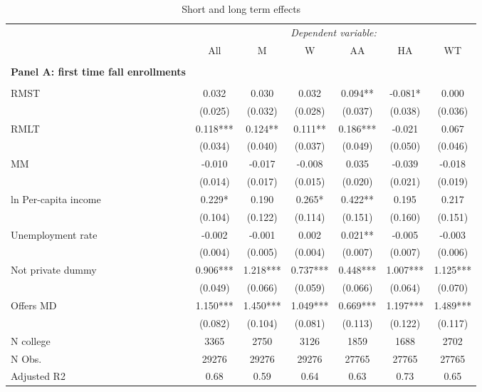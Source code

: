 \documentclass[12pt]{article}%
\begin{document}
\FloatBarrier
\begin{table}[!htbp] \centering 
  \begin{threeparttable}
      \caption{Short and long term effects }
   \label{table:sl}
  \small
\begin{tabular}{@{\extracolsep{-6pt}}lcccccc} 
\toprule
 & \multicolumn{6}{c}{\textit{ Dependent variable:}} \\ 
\cline{2-7} 
& All & M & W & AA & HA & WT \\
\midrule  \\[-1.8ex] 
\textbf{Panel A: first time fall enrollments}\\ \\[-1.8ex] 
RMST & 0.032 & 0.030 & 0.032 & 0.094** & -0.081* & 0.000 \\
& (0.025) & (0.032) & (0.028) & (0.037) & (0.038) & (0.036) \\
RMLT & 0.118*** & 0.124** & 0.111** & 0.186*** & -0.021 & 0.067 \\
& (0.034) & (0.040) & (0.037) & (0.049) & (0.050) & (0.046) \\
MM & -0.010 & -0.017 & -0.008 & 0.035 & -0.039 & -0.018 \\
& (0.014) & (0.017) & (0.015) & (0.020) & (0.021) & (0.019) \\
ln Per-capita income & 0.229* & 0.190 & 0.265* & 0.422** & 0.195 &
0.217 \\
& (0.104) & (0.122) & (0.114) & (0.151) & (0.160) & (0.151) \\
Unemployment rate & -0.002 & -0.001 & 0.002 & 0.021** & -0.005 &
-0.003 \\
& (0.004) & (0.005) & (0.004) & (0.007) & (0.007) & (0.006) \\
Not private dummy & 0.906*** & 1.218*** & 0.737*** & 0.448*** & 1.007***
& 1.125*** \\
& (0.049) & (0.066) & (0.059) & (0.066) & (0.064) & (0.070) \\
Offers MD & 1.150*** & 1.450*** & 1.049*** & 0.669*** & 1.197*** &
1.489*** \\
& (0.082) & (0.104) & (0.081) & (0.113) & (0.122) & (0.117) \\
\hline
N college & 3365 & 2750 & 3126 & 1859 & 1688 & 2702 \\
N Obs. & 29276 & 29276 & 29276 & 27765 & 27765 & 27765 \\
Adjusted R2 & 0.68 & 0.59 & 0.64 & 0.63 & 0.73 & 0.65 \\


\end{tabular}
\end{threeparttable}
\end{table}
\end{document}

